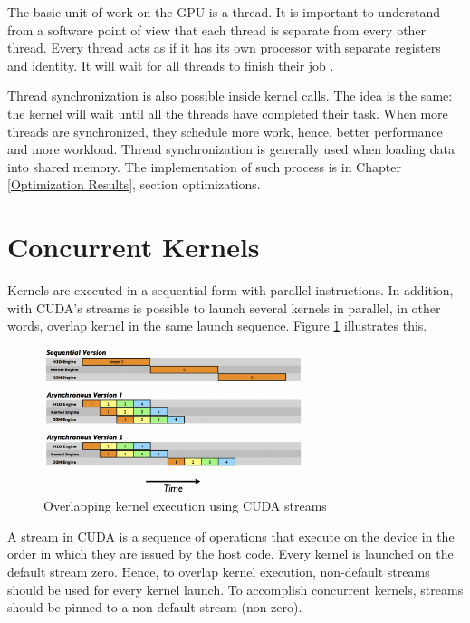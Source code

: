 The basic unit of work on the GPU is a thread. It is important to understand from a software point of view that each thread is separate from every other thread. Every thread acts as if it has its own processor with separate registers and identity. It will wait for all threads to finish their job \cite{design}.

Thread synchronization is also possible inside kernel calls. The idea is the same: the kernel will wait until all the threads have completed their task. When more threads are synchronized, they schedule more work, hence, better performance and more workload. Thread synchronization is generally used when loading data into shared memory. The implementation of such process is in Chapter \ref{Optimization Results}, section optimizations. 

\section{Concurrent Kernels}

Kernels are executed in a sequential form with parallel instructions. In addition, with CUDA's streams is possible to launch several kernels in parallel, in other words, overlap kernel in the same launch sequence. Figure \ref{fig:streams} illustrates this.

\begin{figure}[htbp]
	\centering
		\includegraphics[width=0.68\textwidth]{Figures/streams.png}
		\smallskip
	\caption[Concurrent Kernels]{Overlapping kernel execution using CUDA streams}
	\label{fig:streams}
\end{figure}

A stream in CUDA is a sequence of operations that execute on the device in the order in which they are issued by the host code. Every kernel is launched on the default stream zero. Hence, to overlap kernel execution, non-default streams should be used for every kernel launch. To accomplish concurrent kernels, streams should be pinned to a non-default stream (non zero)\cite{hwu}. 

